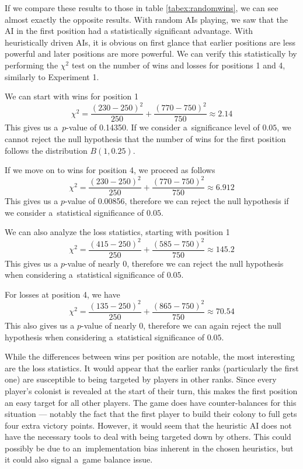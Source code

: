 If we compare these results to those in table \ref{tabex:randomwins}, we can see
almost exactly the opposite results. With random AIs playing, we saw that the AI
in the first position had a statistically significant advantage. With heuristically
driven AIs, it is obvious on first glance that earlier positions are less powerful
and later positions are more powerful. We can verify this statistically by performing
the $\chi^{2}$ test on the number of wins and losses for positions 1 and 4, similarly
to Experiment 1.

We can start with wins for position 1
$$\chi^{2} = \frac{(230 - 250)^{2}}{250} + \frac{(770 - 750)^{2}}{750} \approx 2.14$$
This gives us a~$p$-value of 0.14350. If we consider a~significance level of $0.05$,
we cannot reject the null hypothesis that the number of wins for the first position
follows the distribution $B(1,0.25)$.

If we move on to wins for position 4, we proceed as follows
$$\chi^{2} = \frac{(230 - 250)^{2}}{250} + \frac{(770 - 750)^{2}}{750} \approx 6.912$$
This gives us a $p$-value of 0.00856, therefore we can reject the null hypothesis
if we consider a~statistical significance of $0.05$.

We can also analyze the loss statistics, starting with position 1
$$\chi^{2} = \frac{(415 - 250)^{2}}{250} + \frac{(585 - 750)^{2}}{750} \approx 145.2$$
This gives us a $p$-value of nearly 0, therefore we can reject the null hypothesis
when considering a~statistical significance of $0.05$.

For losses at position 4, we have
$$\chi^{2} = \frac{(135 - 250)^{2}}{250} + \frac{(865 - 750)^{2}}{750} \approx 70.54$$
This also gives us a $p$-value of nearly 0, therefore we can again reject the null hypothesis
when considering a~statistical significance of $0.05$.

While the differences between wins per position are notable, the most interesting
are the loss statistics. It would appear that the earlier ranks (particularly the first one)
are susceptible to being targeted by players in other ranks. Since every player's colonist
is revealed at the start of their turn, this makes the first position an easy target
for all other players. The game does have counter-balances for this situation ---
notably the fact that the first player to build their colony to full gets four extra
victory points. However, it would seem that the heuristic AI does not have the necessary
tools to deal with being targeted down by others. This could possibly be due to
an~implementation bias inherent in the chosen heuristics, but it could also signal
a~game balance issue.

